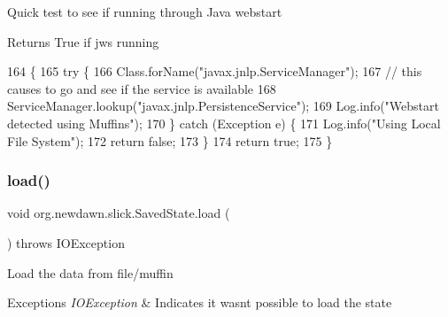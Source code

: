 Quick test to see if running through Java webstart

\begin{DoxyReturn}{Returns}
True if jws running 
\end{DoxyReturn}

\begin{DoxyCode}
164                                           \{
165         \textcolor{keywordflow}{try} \{
166             Class.forName(\textcolor{stringliteral}{"javax.jnlp.ServiceManager"});
167             \textcolor{comment}{// this causes to go and see if the service is available}
168             ServiceManager.lookup(\textcolor{stringliteral}{"javax.jnlp.PersistenceService"});
169             Log.info(\textcolor{stringliteral}{"Webstart detected using Muffins"});
170         \} \textcolor{keywordflow}{catch} (Exception e) \{
171             Log.info(\textcolor{stringliteral}{"Using Local File System"});
172             \textcolor{keywordflow}{return} \textcolor{keyword}{false};
173         \}
174         \textcolor{keywordflow}{return} \textcolor{keyword}{true};
175     \}
\end{DoxyCode}
\mbox{\label{classorg_1_1newdawn_1_1slick_1_1_saved_state_a40cf0eea8c044407bfdee0e801887ed8}} 
\subsubsection{\texorpdfstring{load()}{load()}}
{\footnotesize\ttfamily void org.\+newdawn.\+slick.\+Saved\+State.\+load (\begin{DoxyParamCaption}{ }\end{DoxyParamCaption}) throws I\+O\+Exception\hspace{0.3cm}{\ttfamily [inline]}}

Load the data from file/muffin


\begin{DoxyExceptions}{Exceptions}
{\em I\+O\+Exception} & Indicates it wasn\textquotesingle{}t possible to load the state \\
\hline
\end{DoxyExceptions}

